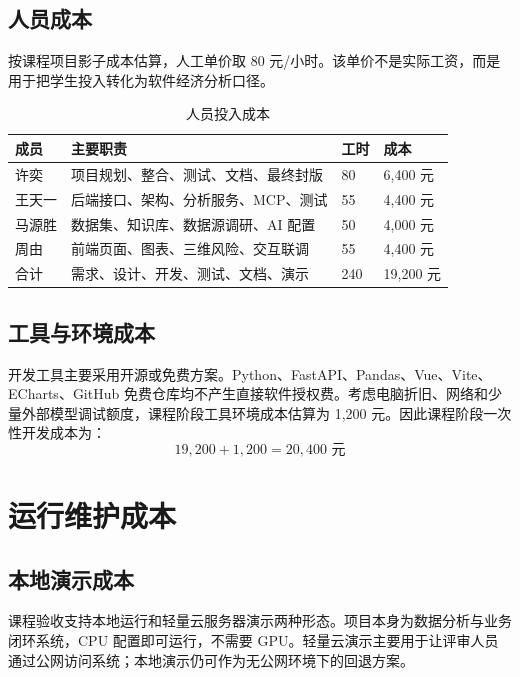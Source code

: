 \documentclass[12pt,a4paper]{ctexart}
\begin{document}
\subsection{人员成本}
按课程项目影子成本估算，人工单价取 80 元/小时。该单价不是实际工资，而是用于把学生投入转化为软件经济分析口径。

\begin{table}[H]
\centering
\caption{人员投入成本}
\begin{tabularx}{\textwidth}{p{2.5cm}Yp{2cm}p{2.4cm}}
\toprule
成员 & 主要职责 & 工时 & 成本 \\
\midrule
许奕 & 项目规划、整合、测试、文档、最终封版 & 80 & 6,400 元 \\
王天一 & 后端接口、架构、分析服务、MCP、测试 & 55 & 4,400 元 \\
马源胜 & 数据集、知识库、数据源调研、AI 配置 & 50 & 4,000 元 \\
周由 & 前端页面、图表、三维风险、交互联调 & 55 & 4,400 元 \\
\midrule
合计 & 需求、设计、开发、测试、文档、演示 & 240 & 19,200 元 \\
\bottomrule
\end{tabularx}
\end{table}

\subsection{工具与环境成本}
开发工具主要采用开源或免费方案。Python、FastAPI、Pandas、Vue、Vite、ECharts、GitHub 免费仓库均不产生直接软件授权费。考虑电脑折旧、网络和少量外部模型调试额度，课程阶段工具环境成本估算为 1,200 元。因此课程阶段一次性开发成本为：
\[
19,200 + 1,200 = 20,400 \text{ 元}
\]

\section{运行维护成本}
\subsection{本地演示成本}
课程验收支持本地运行和轻量云服务器演示两种形态。项目本身为数据分析与业务闭环系统，CPU 配置即可运行，不需要 GPU。轻量云演示主要用于让评审人员通过公网访问系统；本地演示仍可作为无公网环境下的回退方案。
\end{document}
